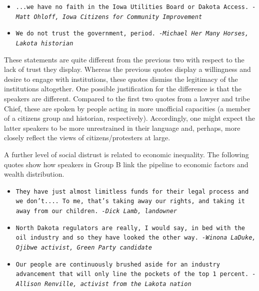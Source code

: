\begin{footnotesize}
\begin{itemize}
\item[] \texttt{...we have no faith in the Iowa Utilities Board or Dakota Access.  \newline 
\textit{-Matt Ohloff, Iowa Citizens for Community Improvement}}
\newline 
\item[] \texttt{We do not trust the government, period. \newline 
\textit{-Michael Her Many Horses, Lakota historian}}
\end{itemize}
\end{footnotesize}  

These statements are quite different from the previous two with respect to the lack of trust they display. Whereas the previous quotes display a willingness and desire to engage with institutions, these quotes dismiss the legitimacy of the institutions altogether. One possible justification for the difference is that the speakers are different. Compared to the first two quotes from a lawyer and tribe Chief, these are spoken by people acting in more unofficial capacities (a member of a citizens group and historian, respectively). Accordingly, one might expect the latter speakers to be more unrestrained in their language and, perhaps, more closely reflect the views of citizens/protesters at large.

A further level of social distrust is related to economic inequality. The following quotes show how speakers in Group B link the pipeline to economic factors and wealth distribution.

\begin{footnotesize}
\begin{itemize}
\item[] \texttt{They have just almost limitless funds for their legal process and we don't.... To me, that's taking away our rights, and taking it away from our children. \newline 
\textit{-Dick Lamb, landowner}}
\newline 
\item[] \texttt{North Dakota regulators are really, I would say, in bed with the oil industry and so they have looked the other way.  \newline 
\textit{-Winona LaDuke, Ojibwe activist, Green Party candidate}}
\newline 
\item[] \texttt{Our people are continuously brushed aside for an industry advancement that will only line the pockets of the top 1 percent. \newline 
\textit{-Allison Renville, activist from the Lakota nation}}
\end{itemize}
\end{footnotesize}  

